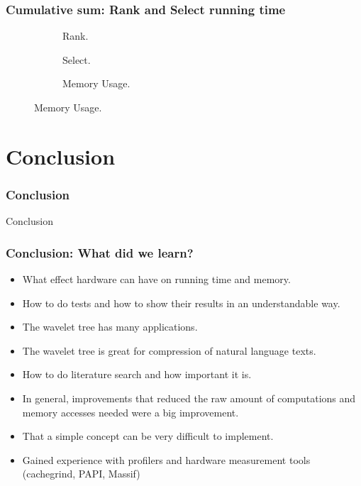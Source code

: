 \documentclass{beamer}
\begin{document}

\begin{frame}
\frametitle{Cumulative sum: Rank and Select running time}
\begin{figure}\tiny
\begin{subfigure}{0.48\textwidth}
	\scalebox{0.5}{}
	\caption{Rank.}
\end{subfigure}
\hfill
\begin{subfigure}{0.48\textwidth}
	\scalebox{0.5}{}
	\caption{Select.}
\end{subfigure}

\begin{subfigure}{0.48\textwidth}
	\scalebox{0.5}{}
	\caption{Memory Usage.}
\end{subfigure}
\end{figure}
\end{frame}


\section{Conclusion}
\begin{frame}
\frametitle{Conclusion}
\begin{center}\Huge{Conclusion}\end{center}
\end{frame}

\begin{frame}
\frametitle{Conclusion: What did we learn?}
\begin{itemize}
\item What effect hardware can have on running time and memory.
\item How to do tests and how to show their results in an understandable way.
\item The wavelet tree has many applications.
\item The wavelet tree is great for compression of natural language texts.
\item How to do literature search and how important it is.
\item In general, improvements that reduced the raw amount of computations and memory accesses needed were a big improvement.
\item That a simple concept can be very difficult to implement.
\item Gained experience with profilers and hardware measurement tools (cachegrind, PAPI, Massif)
\end{itemize}
\end{frame}
\end{document}
